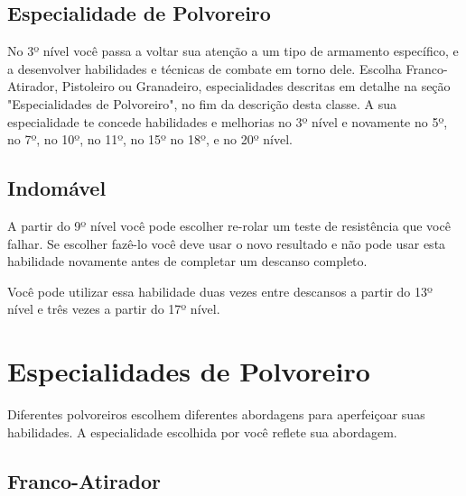 \documentclass[letterpaper,twocolumn,openany]{dndbook}
\begin{document}
	\subsection{Especialidade de Polvoreiro}
	No 3º nível você passa a voltar sua atenção a um tipo de armamento específico, e a desenvolver habilidades e técnicas de combate em torno dele. Escolha Franco-Atirador, Pistoleiro ou Granadeiro, especialidades descritas em detalhe na seção "Especialidades de Polvoreiro", no fim da descrição desta classe. A sua especialidade te concede habilidades e melhorias no 3º nível e novamente no 5º, no 7º, no 10º, no 11º, no 15º no 18º, e no 20º nível.
	
	\subsection{Indomável}
	A partir do 9º nível você pode escolher re-rolar um teste de resistência que você falhar. Se escolher fazê-lo você deve usar o novo resultado e não pode usar esta habilidade novamente antes de completar um descanso completo.
	\par Você pode utilizar essa habilidade duas vezes entre descansos a partir do 13º nível e três vezes a partir do 17º nível.
	
	\section{Especialidades de Polvoreiro}
	Diferentes polvoreiros escolhem diferentes abordagens para aperfeiçoar suas habilidades. A especialidade escolhida por você reflete sua abordagem.
	
	\subsection{Franco-Atirador}
	
\end{document}
